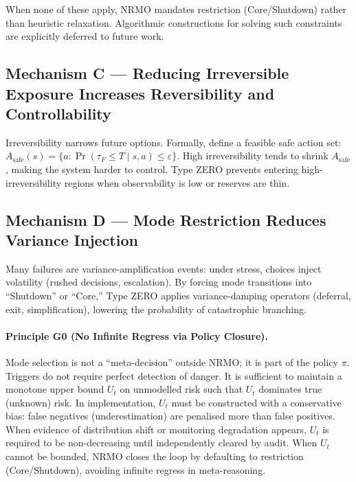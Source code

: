 When none of these apply, NRMO mandates restriction (Core/Shutdown)
rather than heuristic relaxation. Algorithmic constructions for
solving such constraints are explicitly deferred to future work.

\subsection{Mechanism C --- Reducing Irreversible Exposure
Increases Reversibility and Controllability}
\label{sec:foundations-5-3-mechanism-c}

Irreversibility narrows future options. Formally, define a feasible
safe action set:
$A_{\mathrm{safe}}(s) = \{a : \Pr(\tau_F \le T \mid s, a) \le
\varepsilon\}$. High irreversibility tends to shrink
$A_{\mathrm{safe}}$, making the system harder to control. Type ZERO
prevents entering high-irreversibility regions when observability is
low or reserves are thin.

\subsection{Mechanism D --- Mode Restriction Reduces Variance
Injection}
\label{sec:foundations-5-4-mechanism-d}

Many failures are variance-amplification events: under stress,
choices inject volatility (rushed decisions, escalation). By forcing
mode transitions into ``Shutdown'' or ``Core,'' Type ZERO applies
variance-damping operators (deferral, exit, simplification),
lowering the probability of catastrophic branching.

\paragraph{Principle G0 (No Infinite Regress via Policy Closure).}
Mode selection is not a ``meta-decision'' outside NRMO; it is part
of the policy $\pi$. Triggers do not require perfect detection of
danger. It is sufficient to maintain a monotone upper bound $U_t$ on
unmodelled risk such that $U_t$ dominates true (unknown) risk. In
implementation, $U_t$ must be constructed with a conservative bias:
false negatives (underestimation) are penalised more than false
positives. When evidence of distribution shift or monitoring
degradation appears, $U_t$ is required to be non-decreasing until
independently cleared by audit. When $U_t$ cannot be bounded, NRMO
closes the loop by defaulting to restriction (Core/Shutdown),
avoiding infinite regress in meta-reasoning.

